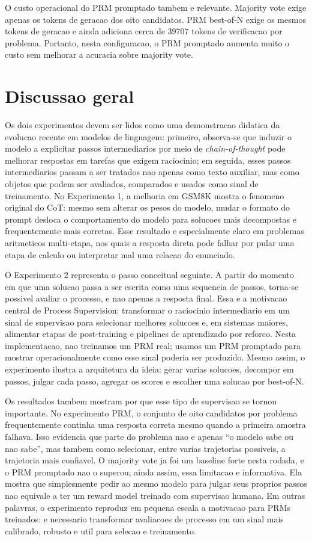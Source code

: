 \documentclass[a4paper,12pt]{article}
\begin{document}
O custo operacional do PRM promptado tambem e relevante. Majority vote exige
apenas os tokens de geracao dos oito candidatos. PRM best-of-N exige os mesmos
tokens de geracao e ainda adiciona cerca de 39707 tokens de verificacao por
problema. Portanto, nesta configuracao, o PRM promptado aumenta muito o custo
sem melhorar a acuracia sobre majority vote.

\section{Discussao geral}

Os dois experimentos devem ser lidos como uma demonstracao didatica da evolucao
recente em modelos de linguagem: primeiro, observa-se que induzir o modelo a
explicitar passos intermediarios por meio de \emph{chain-of-thought} pode
melhorar respostas em tarefas que exigem raciocinio; em seguida, esses passos
intermediarios passam a ser tratados nao apenas como texto auxiliar, mas como
objetos que podem ser avaliados, comparados e usados como sinal de treinamento.
No Experimento 1, a melhoria em GSM8K mostra o fenomeno original do CoT: mesmo
sem alterar os pesos do modelo, mudar o formato do prompt desloca o
comportamento do modelo para solucoes mais decompostas e frequentemente mais
corretas. Esse resultado e especialmente claro em problemas aritmeticos
multi-etapa, nos quais a resposta direta pode falhar por pular uma etapa de
calculo ou interpretar mal uma relacao do enunciado.

O Experimento 2 representa o passo conceitual seguinte. A partir do momento em
que uma solucao passa a ser escrita como uma sequencia de passos, torna-se
possivel avaliar o processo, e nao apenas a resposta final. Essa e a motivacao
central de Process Supervision: transformar o raciocinio intermediario em um
sinal de supervisao para selecionar melhores solucoes e, em sistemas maiores,
alimentar etapas de post-training e pipelines de aprendizado por reforco. Nesta
implementacao, nao treinamos um PRM real; usamos um PRM promptado para mostrar
operacionalmente como esse sinal poderia ser produzido. Mesmo assim, o
experimento ilustra a arquitetura da ideia: gerar varias solucoes, decompor em
passos, julgar cada passo, agregar os scores e escolher uma solucao por
best-of-N.

Os resultados tambem mostram por que esse tipo de supervisao se tornou
importante. No experimento PRM, o conjunto de oito candidatos por problema
frequentemente continha uma resposta correta mesmo quando a primeira amostra
falhava. Isso evidencia que parte do problema nao e apenas ``o modelo sabe ou
nao sabe'', mas tambem como selecionar, entre varias trajetorias possiveis, a
trajetoria mais confiavel. O majority vote ja foi um baseline forte nesta
rodada, e o PRM promptado nao o superou; ainda assim, essa limitacao e
informativa. Ela mostra que simplesmente pedir ao mesmo modelo para julgar seus
proprios passos nao equivale a ter um reward model treinado com supervisao
humana. Em outras palavras, o experimento reproduz em pequena escala a
motivacao para PRMs treinados: e necessario transformar avaliacoes de processo
em um sinal mais calibrado, robusto e util para selecao e treinamento.
\end{document}
